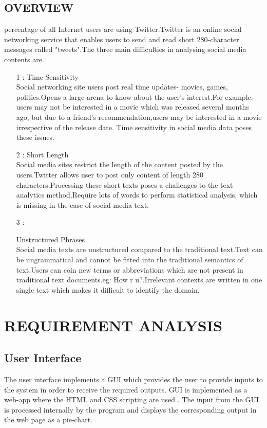 \section{OVERVIEW}
\par
{} percentage of all Internet users are using Twitter.Twitter is an online social networking service that enables users to send and read short 280-character messages called "tweets".The three main difficulties in analysing social media contents are.
 \begin{itemize}
	\item[1 :]{Time Sensitivity \\Social networking site users post real time updates- movies, games, politics.Opens a large arena to know about the user's interest.For example:- users may not be interested in a movie which was released  several months ago, but due to a friend's recommendation,users   may be  interested in   a  movie irrespective of the release date.
Time sensitivity in social media data poses these  issues.}
	\item[2 :]{Short Length\\Social media sites restrict the length of the content posted by the users.Twitter allows user to post only content of length 280 characters.Processing these short texts poses a challenges to the text analytics method.Require lots of words to perform statistical analysis, which is missing in the case of social media text.}
	\item[3 :]{Unstructured Phrases\\Social media texts are unstructured compared to the traditional text.Text can be ungrammatical and cannot be fitted into the traditional semantics of text.Users can coin new terms or abbreviations which are not present in traditional text documents.eg: How r u?.Irrelevant contexts are written in one single text which makes it difficult to identify the domain. 


}
\end{itemize}

\chapter{REQUIREMENT ANALYSIS}
\section{User Interface}
\par
\indent 
The user interface implements a GUI which provides the user to provide inputs to the system in order to receive the required outputs. GUI is implemented as a web-app where the HTML and CSS scripting are used .  The input from the GUI is processed internally by the program and displays the corresponding output in the web page as a pie-chart.
